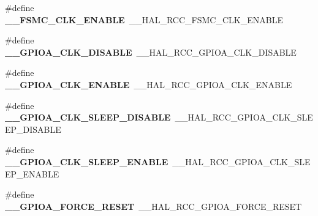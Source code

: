 \begin{DoxyCompactItemize}
\item 
\#define {\bfseries \+\_\+\+\_\+\+F\+S\+M\+C\+\_\+\+C\+L\+K\+\_\+\+E\+N\+A\+B\+LE}~\+\_\+\+\_\+\+H\+A\+L\+\_\+\+R\+C\+C\+\_\+\+F\+S\+M\+C\+\_\+\+C\+L\+K\+\_\+\+E\+N\+A\+B\+LE\hypertarget{group___h_a_l___r_c_c___aliased_ga20b6806843b156dfa5cc96194b7477d3}{}\label{group___h_a_l___r_c_c___aliased_ga20b6806843b156dfa5cc96194b7477d3}

\item 
\#define {\bfseries \+\_\+\+\_\+\+G\+P\+I\+O\+A\+\_\+\+C\+L\+K\+\_\+\+D\+I\+S\+A\+B\+LE}~\+\_\+\+\_\+\+H\+A\+L\+\_\+\+R\+C\+C\+\_\+\+G\+P\+I\+O\+A\+\_\+\+C\+L\+K\+\_\+\+D\+I\+S\+A\+B\+LE\hypertarget{group___h_a_l___r_c_c___aliased_gaeade76c4127a8e0e0f8e0e30d8ed5602}{}\label{group___h_a_l___r_c_c___aliased_gaeade76c4127a8e0e0f8e0e30d8ed5602}

\item 
\#define {\bfseries \+\_\+\+\_\+\+G\+P\+I\+O\+A\+\_\+\+C\+L\+K\+\_\+\+E\+N\+A\+B\+LE}~\+\_\+\+\_\+\+H\+A\+L\+\_\+\+R\+C\+C\+\_\+\+G\+P\+I\+O\+A\+\_\+\+C\+L\+K\+\_\+\+E\+N\+A\+B\+LE\hypertarget{group___h_a_l___r_c_c___aliased_gae43275a9c80a46273ae4a05cee055cb0}{}\label{group___h_a_l___r_c_c___aliased_gae43275a9c80a46273ae4a05cee055cb0}

\item 
\#define {\bfseries \+\_\+\+\_\+\+G\+P\+I\+O\+A\+\_\+\+C\+L\+K\+\_\+\+S\+L\+E\+E\+P\+\_\+\+D\+I\+S\+A\+B\+LE}~\+\_\+\+\_\+\+H\+A\+L\+\_\+\+R\+C\+C\+\_\+\+G\+P\+I\+O\+A\+\_\+\+C\+L\+K\+\_\+\+S\+L\+E\+E\+P\+\_\+\+D\+I\+S\+A\+B\+LE\hypertarget{group___h_a_l___r_c_c___aliased_gac3fe0ce119ec3107d46637f728c85d97}{}\label{group___h_a_l___r_c_c___aliased_gac3fe0ce119ec3107d46637f728c85d97}

\item 
\#define {\bfseries \+\_\+\+\_\+\+G\+P\+I\+O\+A\+\_\+\+C\+L\+K\+\_\+\+S\+L\+E\+E\+P\+\_\+\+E\+N\+A\+B\+LE}~\+\_\+\+\_\+\+H\+A\+L\+\_\+\+R\+C\+C\+\_\+\+G\+P\+I\+O\+A\+\_\+\+C\+L\+K\+\_\+\+S\+L\+E\+E\+P\+\_\+\+E\+N\+A\+B\+LE\hypertarget{group___h_a_l___r_c_c___aliased_ga66771d9c903b9555e82911f0235ad591}{}\label{group___h_a_l___r_c_c___aliased_ga66771d9c903b9555e82911f0235ad591}

\item 
\#define {\bfseries \+\_\+\+\_\+\+G\+P\+I\+O\+A\+\_\+\+F\+O\+R\+C\+E\+\_\+\+R\+E\+S\+ET}~\+\_\+\+\_\+\+H\+A\+L\+\_\+\+R\+C\+C\+\_\+\+G\+P\+I\+O\+A\+\_\+\+F\+O\+R\+C\+E\+\_\+\+R\+E\+S\+ET\hypertarget{group___h_a_l___r_c_c___aliased_ga4d10503baeb5dc73fbb588ab1e7b4ddc}{}\label{group___h_a_l___r_c_c___aliased_ga4d10503baeb5dc73fbb588ab1e7b4ddc}


\end{DoxyCompactItemize}
